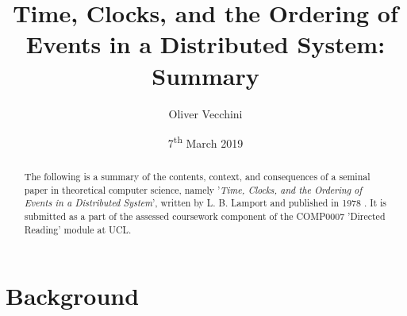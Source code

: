 \documentclass[11pt]{article}
\begin{document}
\title{Time, Clocks, and the Ordering of Events in a Distributed System: 
       Summary}
\author{Oliver Vecchini} 
\date{7\textsuperscript{th} March 2019}

\maketitle


\begin{abstract}

        The following is a summary of the contents, context, and consequences of
        a seminal paper in theoretical computer science, namely '\textit{Time,
        Clocks, and the Ordering of Events in a Distributed System}', written by
        L. B. Lamport and published in 1978 \cite{lamport1978time}. It is
        submitted as a part of the assessed coursework component of the COMP0007
        'Directed Reading' module at UCL.

\end{abstract}


\section{Background}
\end{document}
